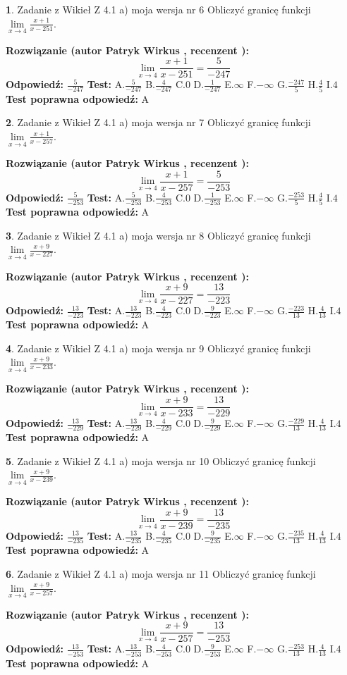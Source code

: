 \documentclass[12pt, a4paper]{article}
\theoremstyle{definition} %
\newtheorem{zad}{}
\newcommand{\zadStart}[1]{\begin{zad}#1\newline}
\newcommand{\zadStop}{\end{zad}}
\newcommand{\rozwStart}[2]{\noindent \textbf{Rozwiązanie (autor #1 , recenzent #2): }\newline}
\newcommand{\rozwStop}{\newline}
\newcommand{\odpStart}{\noindent \textbf{Odpowiedź:}\newline}
\newcommand{\odpStop}{\newline}
\newcommand{\testStart}{\noindent \textbf{Test:}\newline}
\newcommand{\testStop}{\newline}
\newcommand{\kluczStart}{\noindent \textbf{Test poprawna odpowiedź:}\newline}
\newcommand{\kluczStop}{\newline}
\begin{document}
\zadStart{Zadanie z Wikieł Z 4.1 a) moja wersja nr 6}
Obliczyć granicę funkcji $\lim\limits_{x\to4}\frac{x+1}{x-251}$.
\zadStop
\rozwStart{Patryk Wirkus}{}
$$\lim\limits_{x\to4}\frac{x+1}{x-251} = \frac{5}{-247}$$
\rozwStop
\odpStart
$\frac{5}{-247}$
\odpStop
\testStart
A.$\frac{5}{-247}$
B.$\frac{4}{-247}$
C.$0$
D.$\frac{1}{-247}$
E.$\infty$
F.$-\infty$
G.$\frac{-247}{5}$
H.$\frac{4}{5}$
I.$4$
\testStop
\kluczStart
A
\kluczStop



\zadStart{Zadanie z Wikieł Z 4.1 a) moja wersja nr 7}
Obliczyć granicę funkcji $\lim\limits_{x\to4}\frac{x+1}{x-257}$.
\zadStop
\rozwStart{Patryk Wirkus}{}
$$\lim\limits_{x\to4}\frac{x+1}{x-257} = \frac{5}{-253}$$
\rozwStop
\odpStart
$\frac{5}{-253}$
\odpStop
\testStart
A.$\frac{5}{-253}$
B.$\frac{4}{-253}$
C.$0$
D.$\frac{1}{-253}$
E.$\infty$
F.$-\infty$
G.$\frac{-253}{5}$
H.$\frac{4}{5}$
I.$4$
\testStop
\kluczStart
A
\kluczStop



\zadStart{Zadanie z Wikieł Z 4.1 a) moja wersja nr 8}
Obliczyć granicę funkcji $\lim\limits_{x\to4}\frac{x+9}{x-227}$.
\zadStop
\rozwStart{Patryk Wirkus}{}
$$\lim\limits_{x\to4}\frac{x+9}{x-227} = \frac{13}{-223}$$
\rozwStop
\odpStart
$\frac{13}{-223}$
\odpStop
\testStart
A.$\frac{13}{-223}$
B.$\frac{4}{-223}$
C.$0$
D.$\frac{9}{-223}$
E.$\infty$
F.$-\infty$
G.$\frac{-223}{13}$
H.$\frac{4}{13}$
I.$4$
\testStop
\kluczStart
A
\kluczStop



\zadStart{Zadanie z Wikieł Z 4.1 a) moja wersja nr 9}
Obliczyć granicę funkcji $\lim\limits_{x\to4}\frac{x+9}{x-233}$.
\zadStop
\rozwStart{Patryk Wirkus}{}
$$\lim\limits_{x\to4}\frac{x+9}{x-233} = \frac{13}{-229}$$
\rozwStop
\odpStart
$\frac{13}{-229}$
\odpStop
\testStart
A.$\frac{13}{-229}$
B.$\frac{4}{-229}$
C.$0$
D.$\frac{9}{-229}$
E.$\infty$
F.$-\infty$
G.$\frac{-229}{13}$
H.$\frac{4}{13}$
I.$4$
\testStop
\kluczStart
A
\kluczStop



\zadStart{Zadanie z Wikieł Z 4.1 a) moja wersja nr 10}
Obliczyć granicę funkcji $\lim\limits_{x\to4}\frac{x+9}{x-239}$.
\zadStop
\rozwStart{Patryk Wirkus}{}
$$\lim\limits_{x\to4}\frac{x+9}{x-239} = \frac{13}{-235}$$
\rozwStop
\odpStart
$\frac{13}{-235}$
\odpStop
\testStart
A.$\frac{13}{-235}$
B.$\frac{4}{-235}$
C.$0$
D.$\frac{9}{-235}$
E.$\infty$
F.$-\infty$
G.$\frac{-235}{13}$
H.$\frac{4}{13}$
I.$4$
\testStop
\kluczStart
A
\kluczStop



\zadStart{Zadanie z Wikieł Z 4.1 a) moja wersja nr 11}
Obliczyć granicę funkcji $\lim\limits_{x\to4}\frac{x+9}{x-257}$.
\zadStop
\rozwStart{Patryk Wirkus}{}
$$\lim\limits_{x\to4}\frac{x+9}{x-257} = \frac{13}{-253}$$
\rozwStop
\odpStart
$\frac{13}{-253}$
\odpStop
\testStart
A.$\frac{13}{-253}$
B.$\frac{4}{-253}$
C.$0$
D.$\frac{9}{-253}$
E.$\infty$
F.$-\infty$
G.$\frac{-253}{13}$
H.$\frac{4}{13}$
I.$4$
\testStop
\kluczStart
A
\kluczStop
\end{document}
